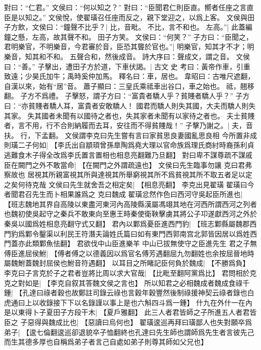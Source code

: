對曰：“仁君。”
文侯曰：“何以知之？”
對曰：“臣聞君仁則臣直。嚮者任座之言直臣是以知之。”
文侯悅，使翟璜召任座而反之，親下堂迎之，以爲上客。
文侯與田子方飲，文侯曰：“鐘聲不比乎？|{
	比，音毗。
	不比，言不和也。
	}
左高。”|{
	此蓋編鐘之懸，左高，故其聲不和。
	}
田子方笑。
文侯曰：“何笑？”
子方曰：“臣聞之，君明樂官，不明樂音，今君審於音，臣恐其聾於官也。”|{
	明樂官，知其才不才；明樂音，知其和不和。
	五聲合和，然後成音。
	詩大序曰：聲成文，謂之音。
	}
文侯曰：“善。”
子擊出，遭田子方於道，下車伏謁。|{
	古文 史 考曰：黃帝作車，引重致遠；少昊氏加牛；禹時奚仲加馬。
	釋名曰：車，居也。
	韋昭曰：古唯尺遮翻，自漢以來，始有“居”音。
	蕭子顯曰：三皇氏乘祗車出谷口，車之始也。
	祗，翹移翻。
	}
子方不爲禮。
子擊怒，謂子方曰：“富貴者驕人乎？貧賤者驕人乎？”
子方曰：“亦貧賤者驕人耳，富貴者安敢驕人！
	國君而驕人則失其國，大夫而驕人則失其家。
	失其國者未聞有以國待之者也，失其家者未聞有以家待之者也。
	夫士貧賤者，言不用，行不合則納履而去耳，安往而不得貧賤哉！”
子擊乃謝之。|{
	夫，音扶。
	行，下孟翻。
	}
文侯謂李克曰先生嘗有言曰家貧思良妻國亂思良相
今所置非成則璜二子何如|{
	【李氏出自顓頊曾孫臯陶爲堯大理以官命族爲理氏商紂時裔孫利貞逃難食木子得全改爲李氏置言置相也相息亮翻難乃旦翻】
	}
對曰卑不謀尊疏不謀戚
臣在闕門之外不敢當命|{
	【在闕門之外謂疏遠也】
	}
文侯曰先生臨事勿讓
克曰君弗察故也
居視其所親富視其所與達視其所舉窮視其所不爲貧視其所不取五者足以定之矣何待克哉
文侯曰先生就舍吾之相定矣|{
	【相息亮翻】}
李克出見翟璜
翟璜曰今者聞君召先生而卜相果誰爲之
克曰魏成
翟璜忿然作色曰西河守吳起臣所進也|{
	【班志魏地其界自高陵以東盡河東河內高陵縣漢屬馮翊其地在河西所謂西河之列者也魏初使吳起守之秦兵不敢東向至惠王時秦使衛鞅擊虜其將公子卭遂獻西河之外於秦吳以國爲姓相息亮翻守式又翻】
	}
君內以鄴爲憂臣進西門豹|{
	【班志鄴縣屬魏郡西門豹爲鄴令鑿渠以利民王符潛夫論姓氏篇曰如有東門西郭南宫北郭皆因居以爲姓西門蓋亦此類鄴魚怯翻】
	}
君欲伐中山臣進樂羊
中山已拔無使守之臣進先生
君之子無傅臣進屈侯鮒|{
	【傅者傅之以德義因以爲官名傅芳遇翻屈九勿翻姓也余按屈晉地時屬魏鮒蓋魏封屈侯也鮒音符遇翻】
	}
以耳目之所睹記臣何負於魏成|{
	【不勝爲負】}
李克曰子言克於子之君者豈將比周以求大官哉|{
	【比毗至翻阿黨爲比】
	}
君問相於克克之對如是|{
	【李克自叙其答魏文侯之言也】}
所以知君之必相魏成者魏成食祿千鍾|{
	【孔達曰祿者穀也故鄭註司錄云祿也言穀年穀豐然後制祿援神契云祿者錄也白虎通曰上以收錄接下下以名錄謹以事上是也六斛四斗爲一鍾】
	}
什九在外什一在內是以東得卜子夏田子方段干木|{
	【夏戶雅翻】}
此三人者君皆師之子所進五人者君皆臣之
子惡得與魏成比也|{
	【惡讀曰烏何也】
	}
翟璜逡巡再拜曰璜鄙人也失對願卒爲弟子|{
	【逡七倫翻逡巡卻退貌卒子恤翻終也孔達曰先生師也謂師爲先生者言彼先己而生其德多厚也自稱爲弟子者言己自處如弟子則尊其師如父兄也】
	}
